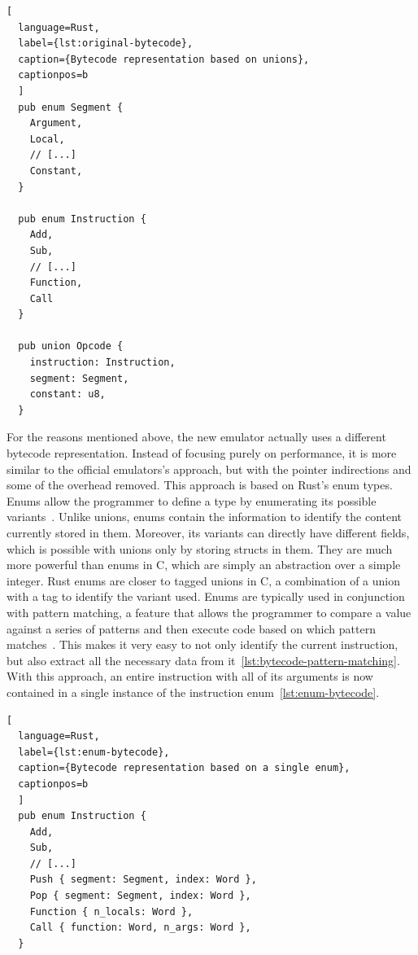 \begin{lstlisting}[
  language=Rust,
  label={lst:original-bytecode},
  caption={Bytecode representation based on unions},
  captionpos=b
  ]
  pub enum Segment {
    Argument,
    Local,
    // [...]
    Constant,
  }

  pub enum Instruction {
    Add,
    Sub,
    // [...]
    Function,
    Call
  }

  pub union Opcode {
    instruction: Instruction,
    segment: Segment,
    constant: u8,
  }
\end{lstlisting}

For the reasons mentioned above, the new emulator actually uses a different bytecode representation. Instead of focusing purely on performance, it is more similar to the official emulators's approach, but with the pointer indirections and some of the overhead removed.
This approach is based on Rust's enum types. Enums allow the programmer to define a type by enumerating its possible variants~\cite[Chapter~6]{klabnik2019rust}.
Unlike unions, enums contain the information to identify the content currently stored in them. Moreover, its variants can directly have different fields, which is possible with unions only by storing structs in them.
They are much more powerful than enums in C, which are simply an abstraction over a simple integer. Rust enums are closer to tagged unions in C, a combination of a union with a tag to identify the variant used.
Enums are typically used in conjunction with pattern matching, a feature that allows the programmer to compare a value against a series of patterns and then execute code based on which pattern matches~\cite[Chapter~6.2]{klabnik2019rust}.
This makes it very easy to not only identify the current instruction, but also extract all the necessary data from it~\ref{lst:bytecode-pattern-matching}.
With this approach, an entire instruction with all of its arguments is now contained in a single instance of the instruction enum~\ref{lst:enum-bytecode}.

\begin{lstlisting}[
  language=Rust,
  label={lst:enum-bytecode},
  caption={Bytecode representation based on a single enum},
  captionpos=b
  ]
  pub enum Instruction {
    Add,
    Sub,
    // [...]
    Push { segment: Segment, index: Word },
    Pop { segment: Segment, index: Word },
    Function { n_locals: Word },
    Call { function: Word, n_args: Word },
  }
\end{lstlisting}

